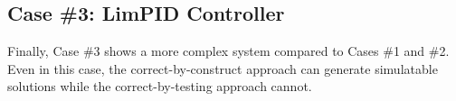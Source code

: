 \subsection{Case \#3: LimPID Controller}
Finally, Case \#3 shows a more complex system compared to Cases \#1 and \#2. Even in this case, the correct-by-construct approach can generate simulatable solutions while the correct-by-testing approach cannot. 